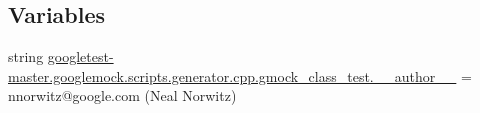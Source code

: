 \subsection*{Variables}
\begin{DoxyCompactItemize}
\item 
string \mbox{\hyperlink{namespacegoogletest-master_1_1googlemock_1_1scripts_1_1generator_1_1cpp_1_1gmock__class__test_af095836428da5014d050eea22949cafa}{googletest-\/master.\+googlemock.\+scripts.\+generator.\+cpp.\+gmock\+\_\+class\+\_\+test.\+\_\+\+\_\+author\+\_\+\+\_\+}} = \textquotesingle{}nnorwitz@google.\+com (Neal Norwitz)\textquotesingle{}
\end{DoxyCompactItemize}
